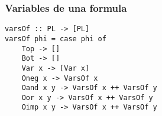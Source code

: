 \documentclass[11pt]{article}
\begin{document}
\subsubsection{Variables de una formula}
\label{sec-2-3-3}
\begin{verbatim}
varsOf :: PL -> [PL]
varsOf phi = case phi of
    Top -> []
    Bot -> []
    Var x -> [Var x]
    Oneg x -> VarsOf x
    Oand x y -> VarsOf x ++ VarsOf y
    Oor x y -> VarsOf x ++ VarsOf y
    Oimp x y -> VarsOf x ++ VarsOf y
\end{verbatim}
\end{document}
